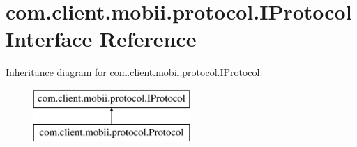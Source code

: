 \hypertarget{interfacecom_1_1client_1_1mobii_1_1protocol_1_1_i_protocol}{\section{com.\-client.\-mobii.\-protocol.\-I\-Protocol Interface Reference}
\label{interfacecom_1_1client_1_1mobii_1_1protocol_1_1_i_protocol}
}
Inheritance diagram for com.\-client.\-mobii.\-protocol.\-I\-Protocol\-:\begin{figure}[H]
\begin{center}
\leavevmode
\includegraphics[height=2.000000cm]{interfacecom_1_1client_1_1mobii_1_1protocol_1_1_i_protocol}
\end{center}
\end{figure}
